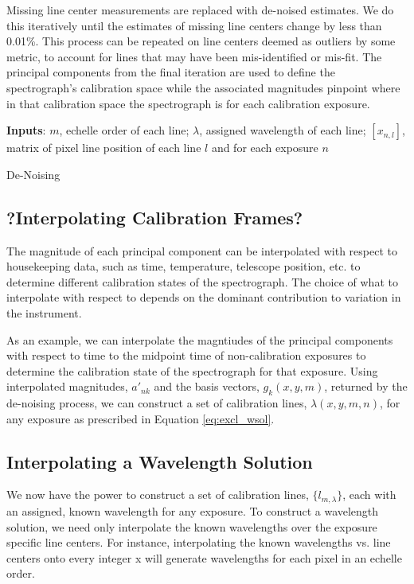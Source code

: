 \documentclass[twocolumn]{aastex63}
\begin{document}
Missing line center measurements are replaced with de-noised estimates.  We do this iteratively until the estimates of missing line centers change by less than 0.01\%.  This process can be repeated on line centers deemed as outliers by some metric, to account for lines that may have been mis-identified or mis-fit.  The principal components from the final iteration are used to define the spectrograph's calibration space while the associated magnitudes pinpoint where in that calibration space the spectrograph is for each calibration exposure.

\begin{algorithm}
\SetAlgoLined
\textbf{Inputs}: $m$, echelle order of each line; $\lambda$, assigned wavelength of each line; $[x_{n,l}] $, matrix of pixel line position of each line $l$ and for each exposure $n$\;
\While{change in missing or outlier line centers $>$ 0.01\%}{
	$g_0(x,y,m) = \overline{x_{n,l}]}$\;
	find $U, \Sigma, V$ s.t. $U\Sigma V^* = (x_{l,n}-g_0(x,y,m))$\;
	let $a_{n,k} = U\cdot \Sigma$ and $g_k(x,y,m) = V$\;
	$\lambda(x,y,m,n) = g_0(x,y,m) + \sum_{k=1}^K a_{nk}\,g_k(x,y,m)$ for $K=6$\;
	$[x_{n,l}] = \lambda(x,y,m,n)$ where $[x_{n,l}]$ was initially $NaN$
	}
\caption{De-Noising}
\end{algorithm}

\subsection{?Interpolating Calibration Frames?}
 \label{sec:interp_time}
The magnitude of each principal component can be interpolated with respect to housekeeping data, such as time, temperature, telescope position, etc. to determine different calibration states of the spectrograph.  The choice of what to interpolate with respect to depends on the dominant contribution to variation in the instrument.

As an example, we can interpolate the magntiudes of the principal components with respect to time to the midpoint time of non-calibration exposures to determine the calibration state of the spectrograph for that exposure.  Using interpolated magnitudes, $a'_{nk}$ and the basis vectors, $g_k(x,y,m)$, returned by the de-noising process, we can construct a set of calibration lines, $\lambda(x,y,m,n)$, for any exposure as prescribed in Equation \ref{eq:excl_wsol}.


\subsection{Interpolating a Wavelength Solution} \label{sec:interp_wsol}
We now have the power to construct a set of calibration lines, $\{l_{m,\lambda}\}$, each with an assigned, known wavelength for any exposure.  To construct a wavelength solution, we need only interpolate the known wavelengths over the exposure specific line centers.  For instance, interpolating the known wavelengths vs. line centers onto every integer x will generate wavelengths for each pixel in an echelle order.
\end{document}

